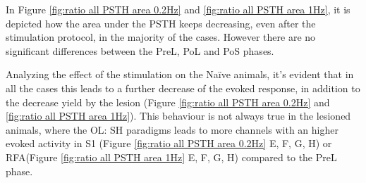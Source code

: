 In Figure \ref{fig:ratio all PSTH area 0.2Hz} and \ref{fig:ratio all PSTH area 1Hz}, it is depicted how the area under the PSTH keeps decreasing, even after the stimulation protocol, in the majority of the cases. However there are no significant differences between the PreL, PoL and PoS phases.

Analyzing the effect of the stimulation on the Naïve animals, it's evident that in all the cases this leads to a further decrease of the evoked response, in addition to the decrease yield by the lesion (Figure \ref{fig:ratio all PSTH area 0.2Hz} and \ref{fig:ratio all PSTH area 1Hz}). This behaviour is not always true in the lesioned animals, where the OL: SH paradigms leads to more channels with an higher evoked activity in S1 (Figure \ref{fig:ratio all PSTH area 0.2Hz} E, F, G, H) or RFA(Figure \ref{fig:ratio all PSTH area 1Hz} E, F, G, H) compared to the PreL phase.

